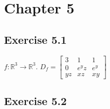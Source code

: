 \section*{Chapter 5}

\subsection*{Exercise 5.1}

$f: \mathbb{R}^3 \to \mathbb{R}^3$. $D_f = \begin{bmatrix} 3 & 1 & 1 \\ 0 & e^yz & e^y \\ yz & xz & xy \end{bmatrix}$

\subsection*{Exercise 5.2}

